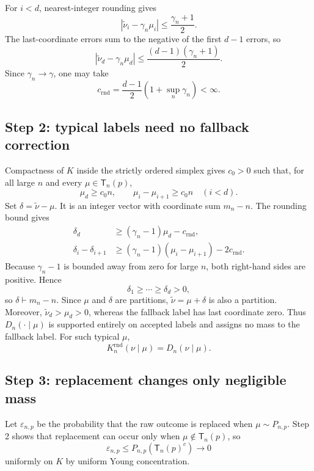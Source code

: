 \documentclass[11pt]{article}
\begin{document}
For $i<d$, nearest-integer rounding gives
\[
  |\widetilde\nu_i-\gamma_n\mu_i|
  \leq\frac{\gamma_n+1}{2}.
\]
The last-coordinate errors sum to the negative of the first $d-1$ errors,
so
\[
  |\widetilde\nu_d-\gamma_n\mu_d|
  \leq\frac{(d-1)(\gamma_n+1)}2.
\]
Since $\gamma_n\to\gamma$, one may take
\begin{equation}\label{eq:crnd-note}
  c_{\mathrm{rnd}}
  =\frac{d-1}{2}\left(1+\sup_n\gamma_n\right)<\infty.
\end{equation}

\subsection*{Step 2: typical labels need no fallback correction}

Compactness of $K$ inside the strictly ordered simplex gives $c_0>0$ such
that, for all large $n$ and every $\mu\in\mathsf T_n(p)$,
\[
  \mu_d\geq c_0n,
  \qquad
  \mu_i-\mu_{i+1}\geq c_0n\quad(i<d).
\]
Set $\delta=\widetilde\nu-\mu$.  It is an integer vector with coordinate
sum $m_n-n$.  The rounding bound gives
\begin{align*}
  \delta_d
  &\geq(\gamma_n-1)\mu_d-c_{\mathrm{rnd}},\\
  \delta_i-\delta_{i+1}
  &\geq(\gamma_n-1)(\mu_i-\mu_{i+1})-2c_{\mathrm{rnd}}.
\end{align*}
Because $\gamma_n-1$ is bounded away from zero for large $n$, both
right-hand sides are positive.  Hence
\[
  \delta_1\geq\cdots\geq\delta_d>0,
\]
so $\delta\vdash m_n-n$.  Since $\mu$ and $\delta$ are partitions,
$\widetilde\nu=\mu+\delta$ is also a partition.  Moreover,
$\widetilde\nu_d>\mu_d>0$, whereas the fallback label has last coordinate
zero.  Thus $D_n(\cdot\mid\mu)$ is supported entirely on accepted labels
and assigns no mass to the fallback label.  For such typical $\mu$,
\[
  K_n^{\mathrm{rnd}}(\nu\mid\mu)=D_n(\nu\mid\mu).
\]

\subsection*{Step 3: replacement changes only negligible mass}

Let $\varepsilon_{n,p}$ be the probability that the raw outcome is replaced
when $\mu\sim P_{n,p}$.  Step 2 shows that replacement can occur only when
$\mu\notin\mathsf T_n(p)$, so
\[
  \varepsilon_{n,p}
  \leq P_{n,p}(\mathsf T_n(p)^c)\longrightarrow0
\]
uniformly on $K$ by uniform Young concentration.
\end{document}
